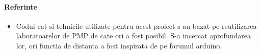 
\paragraph{Referinte}
\begin{itemize}
\item
	\tab Codul cat si tehnicile utilizate pentru acest proiect s-au bazat pe reutilizarea laboratoarelor de PMP de cate ori a fost posibil. S-a incercat aprofundarea lor, ori functia de distanta  a fost inspirata de pe forumul arduino.
\end{itemize}
